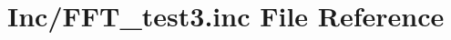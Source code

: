 \hypertarget{_f_f_t__test3_8inc}{}\section{Inc/\+F\+F\+T\+\_\+test3.inc File Reference}
\label{_f_f_t__test3_8inc}
